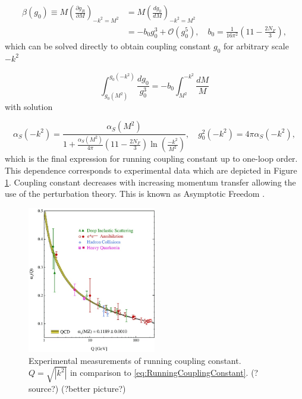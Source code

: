 \begin{align}
  \beta(g_0) \equiv M \left( \frac{\partial g_R}{\partial M} \right)_{-k^2=M^2}
  &= M \left( \frac{dg_0}{dM} \right)_{-k^2=M^2}
  \label{eq:BetaFunction1} \\
  &= -b_0 g_0^3 + \mathscr{O}(g_0^5)
  , \quad b_0 = \frac{1}{16\pi^2}\left(11-\frac{2N_F}{3}\right),
  \label{eq:BetaFunction2}
\end{align}
which can be solved directly to obtain coupling constant $g_0$ for arbitrary
scale $-k^2$

\begin{equation}
  \int_{g_0(M^2)}^{g_0(-k^2)} \frac{dg_0}{g_0^3} =
  -b_0 \int_{M^2}^{-k^2}\frac{dM}{M}
  \label{eq:RunningCouplingConstantIntegralEquation}
\end{equation}
with solution

\begin{equation}
  \alpha_S(-k^2) = \frac{\alpha_S(M^2)}{1 + \frac{\alpha_S(M^2)}{4\pi} \left(
  11-\frac{2N_F}{3} \right) \ln \left( \frac{-k^2}{M^2} \right) }
  , \quad g_0^2(-k^2) = 4 \pi \alpha_S( -k^2 ),
  \label{eq:RunningCouplingConstant}
\end{equation}
which is the final expression for running coupling constant up to one-loop
order. This dependence corresponds to experimental data which are depicted in
Figure \ref{fig:RunningCouplingConstant}. Coupling constant decreases with
increasing momentum transfer allowing the use of the perturbation theory. This
is known as Asymptotic Freedom \cite{AssymptoticFreedom}.

\begin{figure}
  \centering
  \includegraphics[width=0.5\textwidth]{Chapter1/RunningCouplingConstant.jpg}
  \caption{Experimental measurements of running coupling constant.
    $Q=\sqrt{\left|k^2\right|}$ in comparison to
    \eqref{eq:RunningCouplingConstant}. (?source?) (?better picture?)}
  \label{fig:RunningCouplingConstant}
\end{figure}


